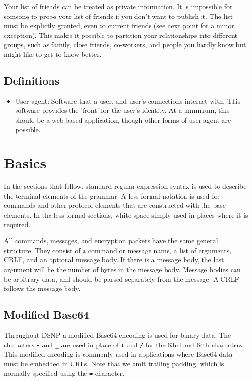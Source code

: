 \documentclass[letterpaper,11pt,oneside]{article}
\begin{document}
Your list of friends can be treated as private information. It is impossible
for someone to probe your list of friends if you don't want to publish it. The
list must be explictly granted, even to current friends (see next point for a
minor exception). This makes it possible to partition your relationships into
different groups, such as family, close friends, co-workers, and people you
hardly know but might like to get to know better.

\subsection{Definitions}

\begin{itemize}

\item User-agent: Software that a user, and user's connections interact with.
This software provides the 'front' for the user's identity. At a minimium, this
should be a web-based application, though other forms of user-agent are
possible.

\end{itemize}

\section{Basics}

In the sections that follow, standard regular expression syntax is used to
describe the terminal elements of the grammar. A less formal notation is used
for commands and other protocol elements that are constructed with the base
elements. In the less formal sections, white space simply used in places where
it is required.

All commands, messages, and encryption packets have the same general structure.
They consist of a command or message name, a list of arguments, CRLF, and an
optional message body. If there is a message body, the last argument will be
the number of bytes in the message body. Message bodies can be arbitrary data,
and should be parsed separately from the message. A CRLF follows the message
body.

\subsection{Modified Base64}

Throughout DSNP a modified Base64 encoding is used for binary data. The
characters \verb|-| and \verb|_| are used in place of \verb|+| and \verb|/| for
the 63rd and 64th characters. This modified encoding is commonly used in
applications where Base64 data must be embedded in URLs. Note that we omit
trailing padding, which is normally specified using the \verb|=| character.
\end{document}
